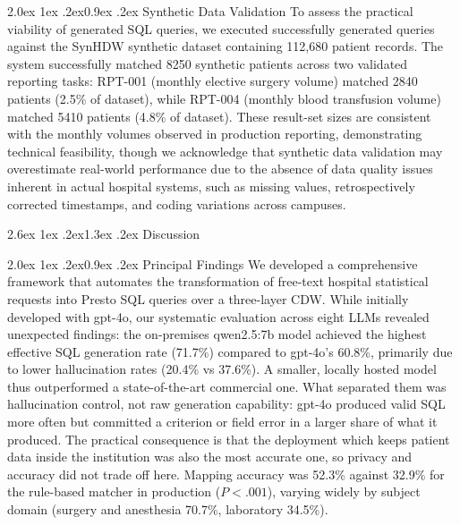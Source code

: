 \documentclass[10pt,twocolumn]{article}
\makeatletter
\renewcommand\section{\@startsection{section}{1}{\z@}%
  {2.6ex \@plus 1ex \@minus .2ex}{1.3ex \@plus .2ex}%
  {\normalfont\large\bfseries}}
\renewcommand\subsection{\@startsection{subsection}{2}{\z@}%
  {2.0ex \@plus 1ex \@minus .2ex}{0.9ex \@plus .2ex}%
  {\normalfont\normalsize\bfseries}}
\makeatother
\begin{document}
\subsection{Synthetic Data Validation}
To assess the practical viability of generated SQL queries, we executed
successfully generated queries against the SynHDW synthetic dataset containing
112,680 patient records. The system successfully matched 8250 synthetic patients
across two validated reporting tasks: RPT-001 (monthly elective surgery volume)
matched 2840 patients (2.5\% of dataset), while RPT-004 (monthly blood transfusion volume) matched 5410 patients (4.8\% of dataset). These result-set
sizes are consistent with the monthly volumes observed in production reporting,
demonstrating technical feasibility, though we acknowledge that synthetic data
validation may overestimate real-world performance due to the absence of data
quality issues inherent in actual hospital systems, such as missing values,
retrospectively corrected timestamps, and coding variations across campuses.

\section{Discussion}

\subsection{Principal Findings}
We developed a comprehensive framework that automates the transformation of
free-text hospital statistical requests into Presto SQL queries over a
three-layer CDW. While initially developed with gpt-4o, our systematic
evaluation across eight LLMs revealed unexpected findings: the on-premises
qwen2.5:7b model achieved the highest effective SQL generation rate (71.7\%)
compared to gpt-4o's 60.8\%, primarily due to lower hallucination rates (20.4\%
vs 37.6\%). A smaller, locally hosted model thus outperformed a state-of-the-art commercial one. What separated them was hallucination control, not raw generation capability: gpt-4o produced valid SQL more often but committed a criterion or field error in a larger share of what it produced. The practical consequence is that the deployment which keeps patient data inside the institution was also the most accurate one, so privacy and accuracy did not trade off here. Mapping accuracy was 52.3\% against 32.9\% for the rule-based matcher in production ($P<.001$), varying widely by subject domain (surgery and anesthesia 70.7\%, laboratory 34.5\%).
\end{document}
